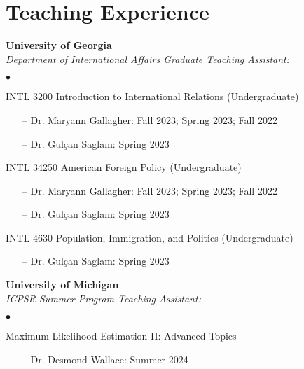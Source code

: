 \documentclass[letterpaper,12pt]{article}
\newenvironment{list2}{
  \begin{list}{$\bullet$}{%
      \setlength{\itemsep}{0in}
      \setlength{\parsep}{0in} 
      \setlength{\parskip}{0in}
      \setlength{\topsep}{0in} 
      \setlength{\partopsep}{0in}
      \setlength{\leftmargin}{1in}
      \setlength{\labelsep}{1em}
      \setlength{\labelwidth}{1em}
      \setlength{\itemindent}{-2em}
      \setlength{\listparindent}{2em}}}{\end{list}}
\begin{document}
\section{Teaching Experience}
\textbf{University of Georgia}\\
\textit{Department of International Affairs Graduate Teaching Assistant:}
\begin{list2}
    \item INTL 3200 Introduction to International Relations (Undergraduate)
        \begin{enumerate}[leftmargin=!,labelindent=0pt,itemindent=-15pt]
            \item[--] Dr. Maryann Gallagher: Fall 2023; Spring 2023; Fall 2022
            \item[--] Dr. Gulçan Saglam: Spring 2023
        \end{enumerate}
    \item INTL 34250 American Foreign Policy (Undergraduate)
        \begin{enumerate}[leftmargin=!,labelindent=0pt,itemindent=-15pt]
            \item[--] Dr. Maryann Gallagher: Fall 2023; Spring 2023; Fall 2022
            \item[--] Dr. Gulçan Saglam: Spring 2023
        \end{enumerate}
    \item INTL 4630 Population, Immigration, and Politics (Undergraduate)
        \begin{enumerate}[leftmargin=!,labelindent=0pt,itemindent=-15pt]
            \item[--] Dr. Gulçan Saglam: Spring 2023
        \end{enumerate}
\end{list2}
\par
\textbf{University of Michigan}\\
\textit{ICPSR Summer Program Teaching Assistant:}
\begin{list2}
    \item Maximum Likelihood Estimation II: Advanced Topics
        \begin{enumerate}[leftmargin=!,labelindent=0pt,itemindent=-15pt]
            \item[--] Dr. Desmond Wallace: Summer 2024
        \end{enumerate}
\end{list2}
\end{document}

